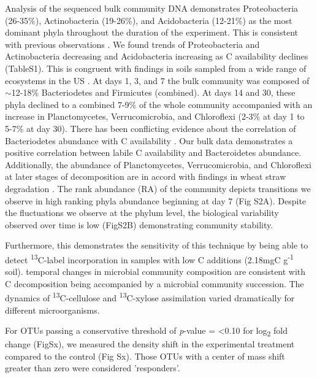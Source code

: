 Analysis of the sequenced bulk community DNA demonstrates Proteobacteria (26-35\%), Actinobacteria (19-26\%), and Acidobacteria (12-21\%) as the most dominant phyla throughout the duration of the experiment. This is consistent with previous observations \cite{Goldfarb_2011,Fierer_2007,Rui_2009,Fierer_2012}. We found trends of Proteobacteria and Actinobacteria decreasing and Acidobacteria increasing as C availability declines (TableS1). This is congruent with findings in soils sampled from a wide range of ecosystems in the US \cite{Fierer_2007}. At days 1, 3, and 7 the bulk community was composed of $\sim$12-18\% Bacteriodetes and Firmicutes (combined).  At days 14 and 30, these phyla declined to a combined 7-9\% of the whole community accompanied with an increase in Planctomycetes, Verrucomicrobia, and Chloroflexi (2-3\% at day 1 to 5-7\% at day 30). There has been conflicting evidence about the correlation of Bacteriodetes abundance with C availability \cite{Fierer_2007,Rui_2009,Sharp_2000,L_pez_Lozano_2013,Bastian_2009}. Our bulk data demonstrates a positive correlation between labile C availability and Bacteroidetes abundance. Additionally, the abundance of Planctomycetes, Verrucomicrobia, and Chloroflexi at later stages of decomposition are in accord with findings in wheat straw degradation \cite{Bastian_2009}. The rank abundance (RA) of the community depicts transitions we observe in high ranking phyla abundance beginning at day 7 (Fig S2A). Despite the fluctuations we observe at the phylum level, the biological variability observed over time is low (FigS2B) demonstrating community stability.


Furthermore, this demonstrates the sensitivity of this technique by being able to detect \textsuperscript{13}C-label incorporation in samples with low C additions (2.18mgC g\textsuperscript{-1} soil).    
temporal changes in microbial community composition are consistent with C decomposition being accompanied by a microbial community succession. The dynamics of \textsuperscript{13}C-cellulose and \textsuperscript{13}C-xylose assimilation varied dramatically for different microorganisms.

For OTUs passing a conservative threshold of \textit{p}-value = <0.10 for log\textsubscript{2} fold change (FigSx), we measured the density shift in the experimental treatment compared to the control (Fig Sx).  Those OTUs with a center of mass shift greater than zero were considered 'responders'.   

